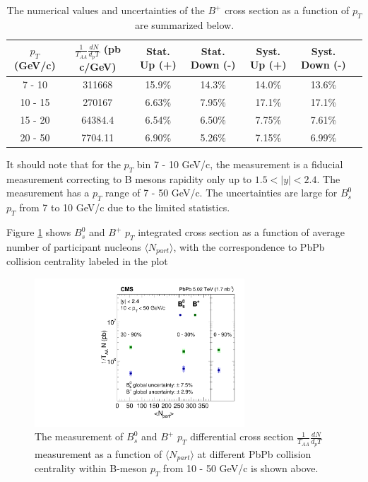 \begin{table}[h]
\begin{center}
\caption{The numerical values and uncertainties of the $B^+$ cross section as a function of $p_T$ are summarized below.}
\vspace{1em}
\label{BPXsectPt}
  \begin{tabular}{| c | c |c | c| c| c| c|}
    \hline
$p_T$ (GeV/c) &  $\frac{1}{T_{AA}} \frac{dN}{d_pT}$ (pb c/GeV) & Stat. Up (+)   & Stat. Down (-)  &  Syst. Up (+)  &  Syst. Down (-) \\
    \hline
    \hline
 7 - 10 &   311668  &  15.9\% & 14.3\% & 14.0\% & 13.6\% \\ 
 10 - 15 & 270167  & 6.63\%  & 7.95\%  & 17.1\% & 17.1\% \\ 
 15 - 20 &  64384.4 & 6.54\%   &  6.50\% & 7.75\% & 7.61\% \\ 
 20 - 50 &  7704.11    & 6.90\%  &  5.26\% & 7.15\% &6.99\% \\ 
    \hline
    \hline
\end{tabular}
\end{center}
\end{table}

It should note that for the $p_T$ bin 7 - 10 GeV/c, the measurement is a fiducial measurement correcting to B mesons rapidity only up to $1.5 < |y| < 2.4$. The measurement has a $p_T$ range of 7 - 50 GeV/c. The uncertainties are large for $B^0_s$ $p_T$ from 7 to 10 GeV/c due to the limited statistics. 



Figure \ref{BmesonDataCent} shows $B^0_s$ and $B^+$ $p_T$ integrated cross section as a function of average number of participant nucleons $\langle N_{part}\rangle$, with the correspondence to PbPb collision centrality labeled in the plot
 

\begin{figure}[hbtp]
\begin{center}
\includegraphics[width=0.70\textwidth]{Figures/Chapter5/xsec_vsCent.pdf}
\caption{The measurement of $B^0_s$ and $B^+$ $p_T$ differential cross section $\frac{1}{T_{AA}} \frac{dN}{d_pT}$ measurement as a function of $\langle N_{part}\rangle$ at different PbPb collision centrality within B-meson $p_T$ from 10 - 50 GeV/c is shown above. }
\label{BmesonDataCent}
\end{center}
\end{figure}

